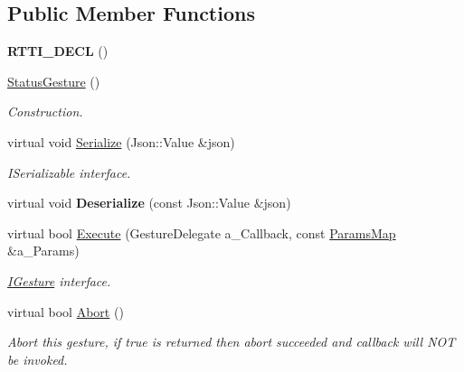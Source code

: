 \subsection*{Public Member Functions}
\begin{DoxyCompactItemize}
\item 
\mbox{\label{class_status_gesture_a7f353d780e9c3b115e9f6b0bafd16e92}} 
{\bfseries R\+T\+T\+I\+\_\+\+D\+E\+CL} ()
\item 
\mbox{\label{class_status_gesture_a79c2131f710c95044672a3de38c53910}} 
\hyperlink{class_status_gesture_a79c2131f710c95044672a3de38c53910}{Status\+Gesture} ()
\begin{DoxyCompactList}\small\item\em Construction. \end{DoxyCompactList}\item 
\mbox{\label{class_status_gesture_a79dc647b42f0bd86f2be667609fdd636}} 
virtual void \hyperlink{class_status_gesture_a79dc647b42f0bd86f2be667609fdd636}{Serialize} (Json\+::\+Value \&json)
\begin{DoxyCompactList}\small\item\em I\+Serializable interface. \end{DoxyCompactList}\item 
\mbox{\label{class_status_gesture_abc820c17f218b0bd20fe5fdad8318fc9}} 
virtual void {\bfseries Deserialize} (const Json\+::\+Value \&json)
\item 
\mbox{\label{class_status_gesture_af2d43cd68d2831424d9bed4c8f59941d}} 
virtual bool \hyperlink{class_status_gesture_af2d43cd68d2831424d9bed4c8f59941d}{Execute} (Gesture\+Delegate a\+\_\+\+Callback, const \hyperlink{class_params_map}{Params\+Map} \&a\+\_\+\+Params)
\begin{DoxyCompactList}\small\item\em \hyperlink{class_i_gesture}{I\+Gesture} interface. \end{DoxyCompactList}\item 
\mbox{\label{class_status_gesture_a5037a5f32e125b63d6fbd04d94936c40}} 
virtual bool \hyperlink{class_status_gesture_a5037a5f32e125b63d6fbd04d94936c40}{Abort} ()
\begin{DoxyCompactList}\small\item\em Abort this gesture, if true is returned then abort succeeded and callback will N\+OT be invoked. \end{DoxyCompactList}\end{DoxyCompactItemize}
